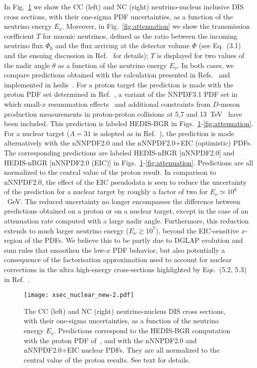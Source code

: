 \documentclass[11pt,a4paper]{article}
\begin{document}
In Fig.~\ref{fig:UHExsec} we show the CC (left) and NC (right)
neutrino-nucleus inclusive DIS cross sections, with their one-sigma PDF
uncertainties, as a function of the neutrino energy $E_\nu$. Moreover, in
Fig.~\ref{fig:attenuation} we show the transmission coefficient $T$ for muonic
neutrinos, defined as the ratio between the incoming neutrino flux $\Phi_0$ and
the flux arriving at the detector volume $\Phi$ (see Eq.~(3.1) and the ensuing
discussion in Ref.~\cite{Garcia:2020jwr} for details); $T$ is displayed for two
values of the nadir angle $\theta$ as a function of the neutrino energy $E_\nu$.
In both cases, we compare predictions obtained with the calculation presented
in Refs.~\cite{Bertone:2018dse,Garcia:2020jwr} and implemented in
{\sc hedis}~\cite{Brown:1971qr}. For a proton target the prediction is made
with the proton PDF set determined in Ref.~\cite{Gauld:2016kpd},
a variant of the NNPDF3.1 PDF set in which small-$x$ resummation
effects~\cite{Ball:2017otu} and additional constraints from $D$-meson
production measurements in proton-proton collisions at 5,7 and
13~TeV~\cite{Aaij:2013mga,Aaij:2015bpa,Aaij:2016jht} have been included.
This prediction is labeled HEDIS-BGR in
Figs.~\ref{fig:UHExsec}-\ref{fig:attenuation}. For a nuclear
target ($A=31$ is adopted as in Ref.~\cite{Garcia:2020jwr}), the prediction is
made alternatively with the nNNPDF2.0 and the nNNPDF2.0+EIC (optimistic) PDFs.
The corresponding predictions are labeled HEDIS-nBGR [nNNPDF2.0] and HEDIS-nBGR
[nNNPDF2.0 (EIC)] in Figs.~\ref{fig:UHExsec}-\ref{fig:attenuation}. Predictions
are all normalized to the central value of the proton result. In comparison to
nNNPDF2.0, the effect of the EIC pseudodata is seen to reduce the uncertainty
of the prediction for a nuclear target by roughly a factor of two for
$E_\nu\simeq 10^6$~GeV. The reduced uncertainty no longer encompasses the
difference between predictions obtained on a proton or on a nuclear target,
except in the case of an attenuation rate computed with a large nadir angle.
Furthermore, this reduction extends to much larger neutrino energy
($E_\nu \gtrsim 10^7$), beyond the EIC-sensitive $x$-region
of the PDFs. We believe this to be partly due to DGLAP evolution and sum rules
that smoothen the low-$x$ PDF behavior, but also potentially a consequence of
the factorisation approximation used to account for nuclear corrections in the
ultra high-energy cross-sections highlighted by Eqs.~(5.2, 5.3) in
Ref.~\cite{Garcia:2020jwr}.

\begin{figure}[!t]
  \centering
  \texttt{[image: xsec\_nuclear\_new-2.pdf]}
  \caption{The CC (left) and NC (right) neutrino-nucleus DIS cross
  sections, with their one-sigma uncertainties, as a function of the neutrino
  energy $E_{\nu}$. Predictions correspond to the HEDIS-BGR
  computation~\cite{Garcia:2020jwr} with the proton PDF of~\cite{Gauld:2016kpd},
  and with the nNNPDF2.0 and nNNPDF2.0+EIC nuclear PDFs. They are all
  normalized to the central value of the proton results. See text for details.}
  \label{fig:UHExsec}
\end{figure}
\end{document}
